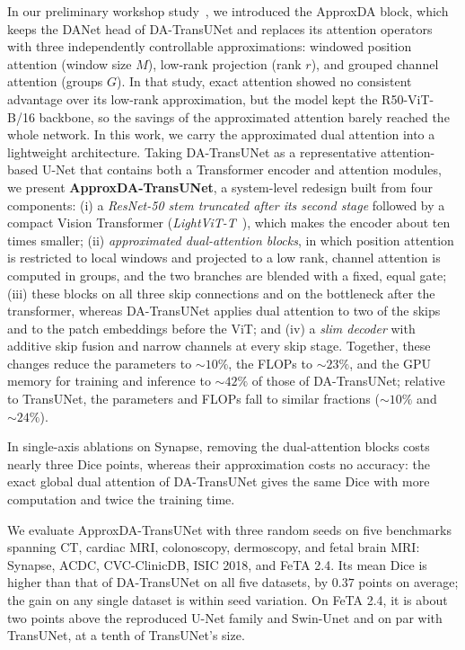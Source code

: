 In our preliminary workshop study~\cite{zhong2026approxda}, we introduced the ApproxDA block, which keeps the DANet head of DA-TransUNet and replaces its attention operators with three independently controllable approximations: windowed position attention (window size $M$), low-rank projection (rank $r$), and grouped channel attention (groups $G$). In that study, exact attention showed no consistent advantage over its low-rank approximation, but the model kept the R50-ViT-B/16 backbone, so the savings of the approximated attention barely reached the whole network. In this work, we carry the approximated dual attention into a lightweight architecture. Taking DA-TransUNet as a representative attention-based U-Net that contains both a Transformer encoder and attention modules, we present \textbf{ApproxDA-TransUNet}, a system-level redesign built from four components:
(i) a \emph{ResNet-50 stem truncated after its second stage} followed by a compact Vision Transformer (\emph{LightViT-T}~\cite{huang2022lightvit}), which makes the encoder about ten times smaller;
(ii) \emph{approximated dual-attention blocks}, in which position attention is restricted to local windows and projected to a low rank, channel attention is computed in groups, and the two branches are blended with a fixed, equal gate;
(iii) these blocks on all three skip connections and on the bottleneck after the transformer, whereas DA-TransUNet applies dual attention to two of the skips and to the patch embeddings before the ViT; and
(iv) a \emph{slim decoder} with additive skip fusion and narrow channels at every skip stage.
Together, these changes reduce the parameters to ${\sim}10\%$, the FLOPs to ${\sim}23\%$, and the GPU memory for training and inference to ${\sim}42\%$ of those of DA-TransUNet; relative to TransUNet, the parameters and FLOPs fall to similar fractions (${\sim}10\%$ and ${\sim}24\%$).

In single-axis ablations on Synapse, removing the dual-attention blocks costs nearly three Dice points, whereas their approximation costs no accuracy: the exact global dual attention of DA-TransUNet gives the same Dice with more computation and twice the training time.

We evaluate ApproxDA-TransUNet with three random seeds on five benchmarks spanning CT, cardiac MRI, colonoscopy, dermoscopy, and fetal brain MRI: Synapse, ACDC, CVC-ClinicDB, ISIC 2018, and FeTA 2.4. Its mean Dice is higher than that of DA-TransUNet on all five datasets, by $0.37$ points on average; the gain on any single dataset is within seed variation. On FeTA 2.4, it is about two points above the reproduced U-Net family and Swin-Unet and on par with TransUNet, at a tenth of TransUNet's size.

